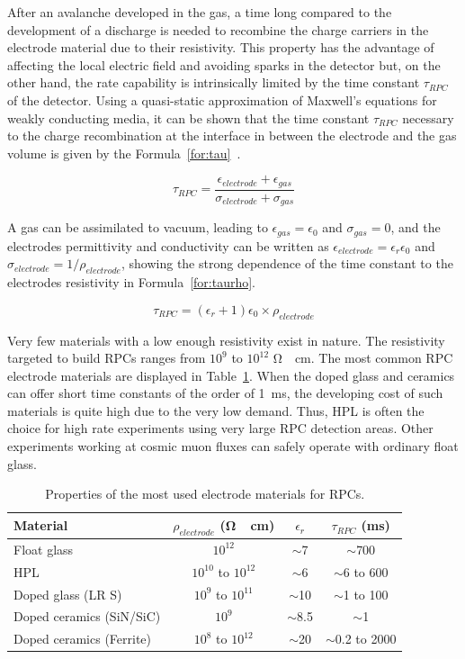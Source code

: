	After an avalanche developed in the gas, a time long compared to the development of a discharge is needed to recombine the charge carriers in the electrode material due to their resistivity. This property has the advantage of affecting the local electric field and avoiding sparks in the detector but, on the other hand, the rate capability is intrinsically limited by the time constant $\tau_{RPC}$ of the detector. Using a quasi-static approximation of Maxwell’s equations for weakly conducting media, it can be shown that the time constant $\tau_{RPC}$ necessary to the charge recombination at the interface in between the electrode and the gas volume is given by the Formula~\ref{for:tau}~\cite{RIEGLER2002}.
	
	\begin{equation}
		\label{for:tau}
		\tau_{RPC} = \frac{\epsilon_{electrode}+\epsilon_{gas}}{\sigma_{electrode}+\sigma_{gas}}
	\end{equation}
	
	A gas can be assimilated to vacuum, leading to $\epsilon_{gas} = \epsilon_0$ and $\sigma_{gas} = 0$, and the electrodes permittivity and conductivity can be written as $\epsilon_{electrode} = \epsilon_r\epsilon_0$ and $\sigma_{electrode} = 1/\rho_{electrode}$, showing the strong dependence of the time constant to the electrodes resistivity in Formula~\ref{for:taurho}.
	
	\begin{equation}
		\label{for:taurho}
		\tau_{RPC} = (\epsilon_r + 1)\epsilon_0\times\rho_{electrode}
	\end{equation}
	
	Very few materials with a low enough resistivity exist in nature. The resistivity targeted to build RPCs ranges from $10^9$ to $10^{12}$ \si{\ohm\cdot cm}. The most common RPC electrode materials are displayed in Table~\ref{tab:tau}. When the doped glass and ceramics can offer short time constants of the order of \SI{1}{ms}, the developing cost of such materials is quite high due to the very low demand. Thus, \acf{HPL} is often the choice for high rate experiments using very large RPC detection areas. Other experiments working at cosmic muon fluxes can safely operate with ordinary float glass.
	
	\begin{table}[H]
		\centering
		\begin{tabular}{|l|c|c|c|}
		\hline
		Material & $\rho_{electrode}$ (\si{\ohm\cdot cm}) & $\epsilon_r$ & $\tau_{RPC}$ (\si{ms})\\
		\hline
		Float glass & $10^{12}$ & $\sim$7 & $\sim$700\\
		\acl{HPL} & $10^{10}$ to $10^{12}$ & $\sim$6 & $\sim$6 to 600\\
		Doped glass (LR S) & $10^{9}$ to $10^{11}$ & $\sim$10 & $\sim$1 to 100\\
		Doped ceramics (SiN/SiC) & $10^{9}$ & $\sim$8.5 & $\sim$1\\
		Doped ceramics (Ferrite) & $10^{8}$ to $10^{12}$ & $\sim$20 & $\sim$0.2 to 2000\\
		\hline
		\end{tabular}
		\caption{\label{tab:tau} Properties of the most used electrode materials for RPCs.}
	\end{table}

